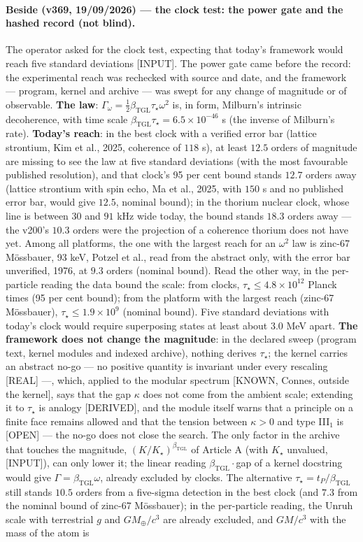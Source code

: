 \documentclass[11pt]{article}
\newcommand{\bTGL}{\beta_{\mathrm{TGL}}}\newcommand{\Msun}{M_{\odot}}\newcommand{\TGL}{\mathrm{TGL}}
\theoremstyle{definition}\newtheorem{deriv}{Derivation}
\begin{document}
\paragraph*{Beside (v369, 19/09/2026) --- the clock test: the power gate and the hashed record (not blind).} The operator asked for the clock test, expecting that today's framework would reach five standard deviations [INPUT]. The power gate came before the record: the experimental reach was rechecked with source and date, and the framework --- program, kernel and archive --- was swept for any change of magnitude or of observable. \textbf{The law}: $\Gamma_\omega=\tfrac12\bTGL\tau_\star\omega^2$ is, in form, Milburn's intrinsic decoherence, with time scale $\bTGL\tau_\star=6.5\times10^{-46}$ s (the inverse of Milburn's rate). \textbf{Today's reach}: in the best clock with a verified error bar (lattice strontium, Kim et al., 2025, coherence of $118$ s), at least $12.5$ orders of magnitude are missing to see the law at five standard deviations (with the most favourable published resolution), and that clock's 95 per cent bound stands $12.7$ orders away (lattice strontium with spin echo, Ma et al., 2025, with $150$ s and no published error bar, would give $12.5$, nominal bound); in the thorium nuclear clock, whose line is between $30$ and $91$ kHz wide today, the bound stands $18.3$ orders away --- the v200's $10.3$ orders were the projection of a coherence thorium does not have yet. Among all platforms, the one with the largest reach for an $\omega^2$ law is zinc-67 Mössbauer, 93 keV, Potzel et al., read from the abstract only, with the error bar unverified, 1976, at $9.3$ orders (nominal bound). Read the other way, in the per-particle reading the data bound the scale: from clocks, $\tau_\star\le 4.8\times10^{12}$ Planck times (95 per cent bound); from the platform with the largest reach (zinc-67 Mössbauer), $\tau_\star\le 1.9\times10^{9}$ (nominal bound). Five standard deviations with today's clock would require superposing states at least about $3.0$ MeV apart. \textbf{The framework does not change the magnitude}: in the declared sweep (program text, kernel modules and indexed archive), nothing derives $\tau_\star$; the kernel carries an abstract no-go --- no positive quantity is invariant under every rescaling [REAL] ---, which, applied to the modular spectrum [KNOWN, Connes, outside the kernel], says that the gap $\kappa$ does not come from the ambient scale; extending it to $\tau_\star$ is analogy [DERIVED], and the module itself warns that a principle on a finite face remains allowed and that the tension between $\kappa>0$ and type III$_1$ is [OPEN] --- the no-go does not close the search. The only factor in the archive that touches the magnitude, $(K/K_\star)^{\bTGL}$ of Article A (with $K_\star$ unvalued, [INPUT]), can only lower it; the linear reading $\bTGL\cdot$gap of a kernel docstring would give $\Gamma=\bTGL\omega$, already excluded by clocks. The alternative $\tau_\star=t_P/\bTGL$ still stands $10.5$ orders from a five-sigma detection in the best clock (and $7.3$ from the nominal bound of zinc-67 Mössbauer); in the per-particle reading, the Unruh scale with terrestrial $g$ and $GM_\oplus/c^3$ are already excluded, and $GM/c^3$ with the mass of the atom is 
\end{document}
